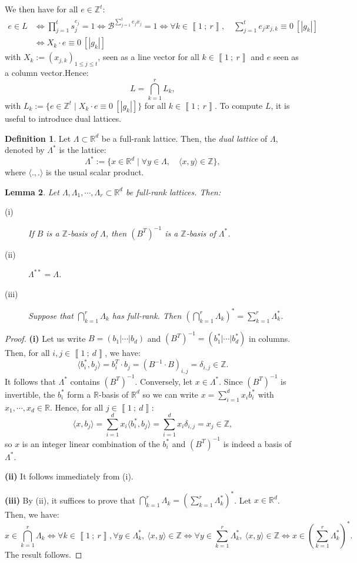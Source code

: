 \documentclass[a4paper,10pt]{report}
\theoremstyle{definition}
\newtheorem{Definition}{Definition}[chapter]
\theoremstyle{plain}
\newtheorem{Lemma}[Definition]{Lemma}
\theoremstyle{definition}
\newcommand{\Z}{\mathbb{Z}}
\newcommand{\R}{\mathbb{R}}
\newcommand{\m}[1]{\mathcal{#1}}
\renewcommand{\i}[2]{\left\llbracket #1~;~#2\right\rrbracket}
\renewcommand{\(}{\left(}
\renewcommand{\)}{\right)}
\begin{document}
We then have for all $e\in\Z^t$:
\begin{align*} e\in L&\Longleftrightarrow \prod_{j=1}^t s_j^{e_j}=1\Longleftrightarrow \m{B}^{\sum_{j=1}^t e_jx_j}=1\Longleftrightarrow \forall k\in\i{1}{r},\quad \sum_{j=1}^t e_jx_{j,k}\equiv 0 \  [|g_k|]\\
&\Longleftrightarrow X_k\cdot e\equiv 0 \ [|g_k|]
\end{align*}
with $X_k:=(x_{j,k})_{1\leq j\leq t}$, seen as a line vector for all $k\in\i{1}{r}$ and $e$ seen as a column vector.Hence:
\[L=\bigcap_{k=1}^r L_k,\]
with $L_k:=\{e\in\Z^t\mid X_k\cdot e\equiv 0 \ [|g_k|]\}$ for all $k\in\i{1}{r}$.  To compute $L$, it is useful to introduce dual lattices. 

\begin{Definition}
Let $\Lambda\subset\R^d$ be a full-rank lattice. Then, the \emph{dual lattice} of $\Lambda$, denoted by $\Lambda^*$ is the lattice:
\[\Lambda^*:=\{x\in\R^d\mid \forall y\in\Lambda, \quad \langle x,y\rangle\in\Z\},\]
where $\langle.,.\rangle$ is the usual scalar product.
\end{Definition}

\begin{Lemma}\label{Lemma 16}
Let $\Lambda, \Lambda_1, \cdots, \Lambda_r\subset\R^d$ be full-rank lattices.  Then:

\begin{description}
\item[(i)] If $B$ is a $\Z$-basis of $\Lambda$, then $(B^T)^{-1}$ is a $\Z$-basis of $\Lambda^*$.
\item[(ii)] $\Lambda^{**}=\Lambda$.
\item[(iii)] Suppose that $\bigcap_{k=1}^r\Lambda_k$ has full-rank. Then $ \(\bigcap_{k=1}^r\Lambda_k\)^*=\sum_{k=1}^r \Lambda_k^*$.
\end{description}
\end{Lemma}

\begin{proof}
\textbf{(i)} Let us write $B=(b_1|\cdots|b_d)$ and  $(B^T)^{-1}=(b_1^*|\cdots|b_d^*)$ in columns.  Then, for all $i,j \in\i{1}{d}$, we have:
\[\langle b_i^*, b_j\rangle=b_i^T\cdot b_j=(B^{-1}\cdot B)_{i, j}=\delta_{i,j}\in\Z.\]
It follows that $\Lambda^*$ contains $(B^T)^{-1}$. Conversely, let $x\in\Lambda^*$. Since $(B^T)^{-1}$ is invertible, the $b_i^*$ form a $\R$-basis of $\R^d$ so we can write $x=\sum_{i=1}^d x_i b_i^*$ with $x_1, \cdots, x_d\in\R$. Hence, for all $j\in\i{1}{d}$:
\[\langle x, b_j\rangle=\sum_{i=1}^d x_i\langle b_i^*,b_j\rangle=\sum_{i=1}^d x_i\delta_{i, j}=x_j\in\Z,\]
so $x$ is an integer linear combination of the $b_i^*$ and $(B^T)^{-1}$ is indeed a basis of $\Lambda^*$.

\textbf{(ii)} It follows immediately from (i).

\textbf{(iii)} By (ii), it suffices to prove that $\bigcap_{k=1}^r\Lambda_k=\(\sum_{k=1}^r \Lambda_k^*\)^*$. Let $x\in\R^d$. Then, we have:
\[x\in \bigcap_{k=1}^r\Lambda_k \Longleftrightarrow \forall k\in\i{1}{r}, \forall y\in \Lambda_k^*,  \  \langle x,y\rangle\in \Z\Longleftrightarrow \forall y\in\sum_{k=1}^r\Lambda_k^*, \ \langle x, y\rangle\in\Z\Longleftrightarrow x\in \(\sum_{k=1}^r \Lambda_k^*\)^*.\]
The result follows.
\end{proof}
\end{document}
